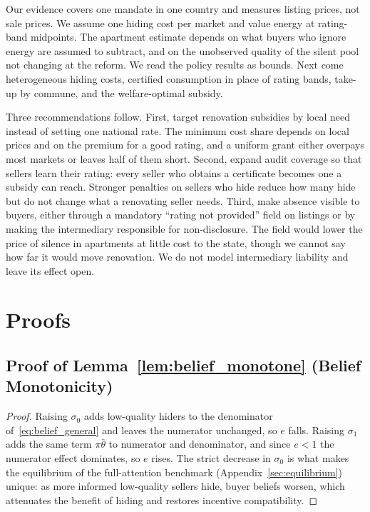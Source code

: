 \documentclass[10pt,letterpaper]{bp-template-concise}
\begin{document}
Our evidence covers one mandate in one country and measures listing prices, not sale prices. We assume one hiding cost per market and value energy at rating-band midpoints. The apartment estimate depends on what buyers who ignore energy are assumed to subtract, and on the unobserved quality of the silent pool not changing at the reform. We read the policy results as bounds. Next come heterogeneous hiding costs, certified consumption in place of rating bands, take-up by commune, and the welfare-optimal subsidy.

Three recommendations follow. First, target renovation subsidies by local need instead of setting one national rate. The minimum cost share depends on local prices and on the premium for a good rating, and a uniform grant either overpays most markets or leaves half of them short. Second, expand audit coverage so that sellers learn their rating: every seller who obtains a certificate becomes one a subsidy can reach. Stronger penalties on sellers who hide reduce how many hide but do not change what a renovating seller needs. Third, make absence visible to buyers, either through a mandatory ``rating not provided'' field on listings or by making the intermediary responsible for non-disclosure. The field would lower the price of silence in apartments at little cost to the state, though we cannot say how far it would move renovation. We do not model intermediary liability and leave its effect open.

\clearpage
\appendix







\section{Proofs}
\label{app:proofs}

\subsection*{Proof of Lemma~\ref{lem:belief_monotone} (Belief Monotonicity)}

\begin{proof}
Raising $\sigma_0$ adds low-quality hiders to the denominator of~\eqref{eq:belief_general} and leaves the numerator unchanged, so $e$ falls. Raising $\sigma_1$ adds the same term $\pi\bar\theta$ to numerator and denominator, and since $e<1$ the numerator effect dominates, so $e$ rises. The strict decrease in $\sigma_0$ is what makes the equilibrium of the full-attention benchmark (Appendix~\ref{sec:equilibrium}) unique: as more informed low-quality sellers hide, buyer beliefs worsen, which attenuates the benefit of hiding and restores incentive compatibility.
\end{proof}
\end{document}
